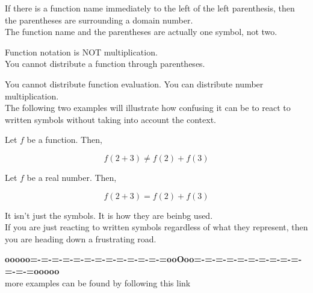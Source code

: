 \documentclass{ximera}
\begin{document}


If there is a function name immediately to the left of the left parenthesis, then the parentheses are surrounding a domain number.   \\


The function name and the parentheses are actually one symbol, not two. \\


\begin{warning}

Function notation is NOT multiplication. \\

You cannot distribute a function through parentheses.


\end{warning}

You cannot distribute function evaluation. You can distribute number multiplication. \\


The following two examples will illustrate how confusing it can be to react to written symbols without taking into account the context.  











\begin{example}


Let $f$ be a function.  Then, 


\[
f(2 + 3) \ne f(2) + f(3)
\]


\end{example}





\begin{example}


Let $f$ be a real number.  Then, 


\[
f(2 + 3) = f(2) + f(3)
\]


\end{example}


It isn't just the symbols.  It is how they are beinbg used. \\


If you are just reacting to written symbols regardless of what they represent, then you are heading down a frustrating road.





\begin{center}
\textbf{\textcolor{green!50!black}{ooooo=-=-=-=-=-=-=-=-=-=-=-=-=ooOoo=-=-=-=-=-=-=-=-=-=-=-=-=ooooo}} \\

more examples can be found by following this link\\ 

\end{center}
\end{document}
